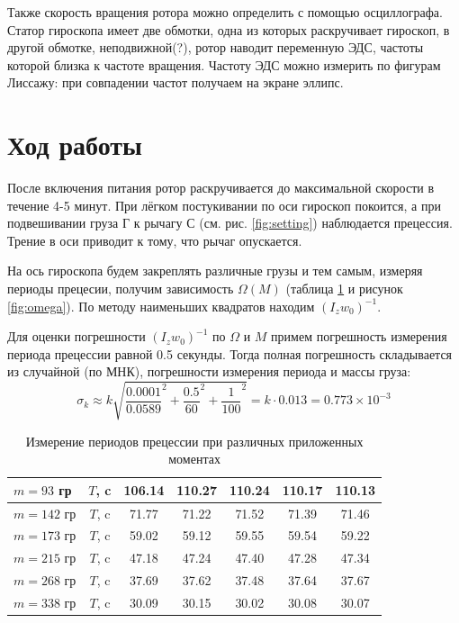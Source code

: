         Также скорость вращения ротора можно определить с помощью осциллографа. Статор гироскопа имеет две обмотки, одна из которых раскручивает гироскоп, в другой обмотке, неподвижной(?), ротор наводит переменную ЭДС, частоты которой близка к частоте вращения. Частоту ЭДС можно измерить по фигурам Лиссажу: при совпадении частот получаем на экране эллипс.

    \section{Ход работы}
        После включения питания ротор раскручивается до максимальной скорости в течение 4-5 минут. При лёгком постукивании по оси гироскоп покоится, а при подвешивании груза Г к рычагу С (см. рис. \ref{fig:setting}) наблюдается прецессия. Трение в оси приводит к тому, что рычаг опускается.

        На ось гироскопа будем закреплять различные грузы и тем самым, измеряя периоды прецесии, получим зависимость $\Omega\left(M\right)$ (таблица \ref{table:periods} и рисунок \ref{fig:omega}). По методу наименьших квадратов находим $\left(I_z w_0\right)^{-1}$.

        Для оценки погрешности $\left(I_z w_0\right)^{-1}$ по $\Omega$ и $M$ примем погрешность измерения периода прецессии равной 0.5 секунды. Тогда полная погрешность складывается из случайной (по МНК), погрешности измерения периода и массы груза:  
        \begin{equation*}
            \sigma_k \approx k \sqrt{\frac{0.0001}{0.0589}^2 + \frac{0.5}{60}^2 + \frac{1}{100}^2} = k \cdot 0.013 = 0.773 \times 10^{-3}
        \end{equation*}

        \begin{table}
            \centering
            \begin{tabular}{|l||c|c|c|c|c|c|}
                \hline
                $m = 93$ гр & $T$, c & 106.14 & 110.27 & 110.24 & 110.17 & 110.13 \\
                \hline
                $m = 142$ гр & $T$, c & 71.77 & 71.22 & 71.52 & 71.39 & 71.46 \\
                \hline
                $m = 173$ гр & $T$, c & 59.02 & 59.12 & 59.55 & 59.54 & 59.22 \\
                \hline
                $m = 215$ гр & $T$, c & 47.18 & 47.24 & 47.40 & 47.28 & 47.34 \\
                \hline
                $m = 268$ гр & $T$, c &37.69 & 37.62 & 37.48 & 37.64 & 37.67 \\
                \hline
                $m = 338$ гр & $T$, c & 30.09 & 30.15 & 30.02 & 30.08 & 30.07 \\
                \hline
            \end{tabular}
            \caption{Измерение периодов прецессии при различных приложенных моментах}
            \label{table:periods}   
        \end{table}

